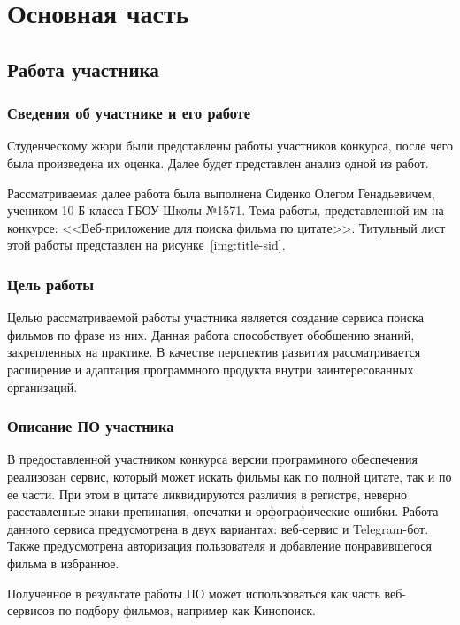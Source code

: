 \chapter{Основная часть}

\section{Работа участника}

\subsection{Сведения об участнике и его работе}

Студенческому жюри были представлены работы участников конкурса, после чего была произведена их оценка. Далее будет представлен анализ одной из работ.

Рассматриваемая далее работа была выполнена Сиденко Олегом Генадьевичем, учеником 10-Б класса ГБОУ Школы №1571. Тема работы, представленной им на конкурсе: <<Веб-приложение для поиска фильма по цитате>>. Титульный лист этой работы представлен на рисунке~\ref{img:title-sid}.

\subsection{Цель работы}

Целью рассматриваемой работы участника является создание сервиса поиска фильмов по фразе из них. Данная работа способствует обобщению знаний, закрепленных на практике. В качестве перспектив развития рассматривается расширение и адаптация программного продукта внутри заинтересованных организаций.

\subsection{Описание ПО участника}

В предоставленной участником конкурса версии программного обеспечения реализован сервис, который может искать фильмы как по полной цитате, так и по ее части. При этом в цитате ликвидируются различия в регистре, неверно расставленные знаки препинания, опечатки и орфографические ошибки. Работа данного сервиса предусмотрена в двух вариантах: веб-сервис и Telegram-бот. Также предусмотрена авторизация пользователя и добавление понравившегося фильма в избранное.

Полученное в результате работы ПО может использоваться как часть веб-сервисов по подбору фильмов, например как Кинопоиск.

